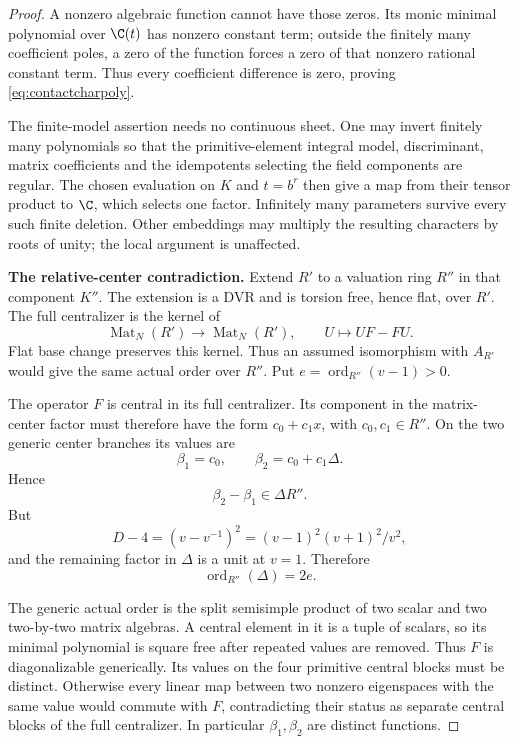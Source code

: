 \documentclass[11pt,a4paper]{article}
\theoremstyle{named}\newtheorem{finding}{Finding}[section]
\theoremstyle{definition}\newtheorem{definition}[finding]{Definition}
\theoremstyle{remark}\newtheorem{remark}[finding]{Remark}
\begin{document}
\begin{proof}
A nonzero algebraic function cannot have those zeros.
Its monic minimal polynomial over $\C(t)$ has nonzero
constant term; outside the finitely many coefficient
poles, a zero of the function forces a zero of that
nonzero rational constant term.
Thus every coefficient difference is zero, proving
\eqref{eq:contactcharpoly}.

The finite-model assertion needs no continuous sheet.
One may invert finitely many polynomials so that the
primitive-element integral model, discriminant, matrix
coefficients and the idempotents selecting the field
components are regular. The chosen evaluation on $K$
and $t=b^r$ then give a map from their tensor product
to $\C$, which selects one factor. Infinitely many
parameters survive every such finite deletion.
Other embeddings may multiply the resulting characters
by roots of unity; the local argument is unaffected.

\par\smallskip\noindent\textbf{The relative-center contradiction.}\quad
Extend $R'$ to a valuation ring $R''$ in that component
$K''$. The extension is a DVR and is torsion free,
hence flat, over $R'$.
The full centralizer is the kernel of
\[
 \operatorname{Mat}_N(R')\longrightarrow
 \operatorname{Mat}_N(R'),\qquad U\longmapsto UF-FU.
\]
Flat base change preserves this kernel.
Thus an assumed isomorphism with $A_{R'}$ would give
the same actual order over $R''$.
Put $e=\operatorname{ord}_{R''}(v-1)>0$.

The operator $F$ is central in its full centralizer.
Its component in the matrix-center factor must
therefore have the form $c_0+c_1x$, with
$c_0,c_1\in R''$.
On the two generic center branches its values are
\[
 \beta_1=c_0,\qquad
 \beta_2=c_0+c_1\Delta.
\]
Hence
\begin{equation}\label{eq:contactdivisibility}
 \beta_2-\beta_1\in\Delta R''.
\end{equation}
But
\[
 D-4=(v-v^{-1})^2
     =(v-1)^2(v+1)^2/v^2,
\]
and the remaining factor in $\Delta$ is a unit at
$v=1$. Therefore
\[
 \operatorname{ord}_{R''}(\Delta)=2e.
\]

The generic actual order is the split semisimple
product of two scalar and two two-by-two matrix
algebras. A central element in it is a tuple of
scalars, so its minimal polynomial is square free
after repeated values are removed. Thus $F$ is
diagonalizable generically.
Its values on the four primitive central blocks
must be distinct. Otherwise every linear map between
two nonzero eigenspaces with the same value would
commute with $F$, contradicting their status as
separate central blocks of the full centralizer.
In particular $\beta_1,\beta_2$ are distinct functions.


\end{proof}
\end{document}
